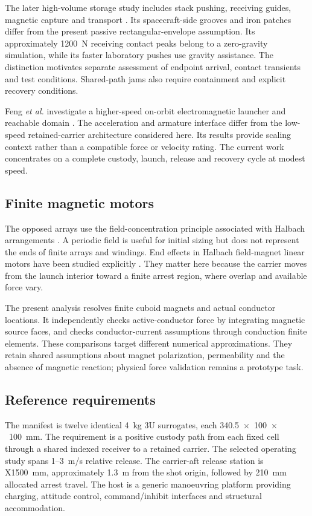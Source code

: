 \documentclass[conference,a4paper]{IEEEtran}
\begin{document}
The later high-volume storage study includes stack pushing, receiving guides, magnetic capture and transport \cite{storage}. Its spacecraft-side grooves and iron patches differ from the present passive rectangular-envelope assumption. Its approximately 1200~N receiving contact peaks belong to a zero-gravity simulation, while its faster laboratory pushes use gravity assistance. The distinction motivates separate assessment of endpoint arrival, contact transients and test conditions. Shared-path jams also require containment and explicit recovery conditions.

Feng \emph{et al.} investigate a higher-speed on-orbit electromagnetic launcher and reachable domain \cite{feng}. The acceleration and armature interface differ from the low-speed retained-carrier architecture considered here. Its results provide scaling context rather than a compatible force or velocity rating. The current work concentrates on a complete custody, launch, release and recovery cycle at modest speed.

\subsection{Finite magnetic motors}
The opposed arrays use the field-concentration principle associated with Halbach arrangements \cite{halbach}. A periodic field is useful for initial sizing but does not represent the ends of finite arrays and windings. End effects in Halbach field-magnet linear motors have been studied explicitly \cite{end}. They matter here because the carrier moves from the launch interior toward a finite arrest region, where overlap and available force vary.

The present analysis resolves finite cuboid magnets and actual conductor locations. It independently checks active-conductor force by integrating magnetic source faces, and checks conductor-current assumptions through conduction finite elements. These comparisons target different numerical approximations. They retain shared assumptions about magnet polarization, permeability and the absence of magnetic reaction; physical force validation remains a prototype task.

\subsection{Reference requirements}
The manifest is twelve identical 4~kg 3U surrogates, each 340.5~$\times$~100~$\times$~100~mm. The requirement is a positive custody path from each fixed cell through a shared indexed receiver to a retained carrier. The selected operating study spans 1--3~m/s relative release. The carrier-aft release station is X1500~mm, approximately 1.3~m from the shot origin, followed by 210~mm allocated arrest travel. The host is a generic manoeuvring platform providing charging, attitude control, command/inhibit interfaces and structural accommodation.
\end{document}
